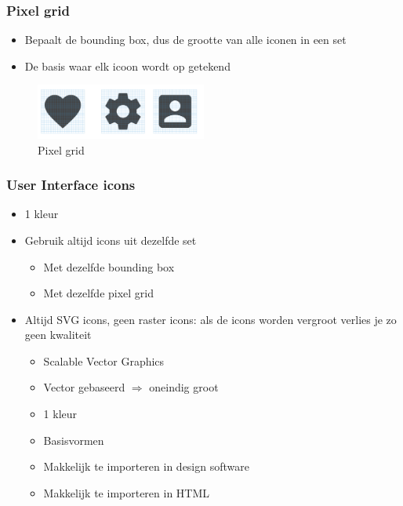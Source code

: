\documentclass{article}
\begin{document}
\subsubsection{Pixel grid}
\begin{itemize}
    \item Bepaalt de bounding box, dus de grootte van alle iconen in een set
    \item De basis waar elk icoon wordt op getekend
\end{itemize}


\begin{figure}[H]
    \centering
    \includegraphics[width=0.5\textwidth]{img/Screenshot_20200512_170736.png}
    \caption{Pixel grid}
\end{figure}

\subsubsection{User Interface icons}
\begin{itemize}
    \item 1 kleur
    \item Gebruik altijd icons uit dezelfde set
    \begin{itemize}
        \item Met dezelfde bounding box
        \item Met dezelfde pixel grid
    \end{itemize} 
    \item Altijd SVG icons, geen raster icons: als de icons worden vergroot verlies je zo geen kwaliteit
    \begin{itemize}
        \item Scalable Vector Graphics
        \item Vector gebaseerd $\Rightarrow$ oneindig groot
        \item 1 kleur
        \item Basisvormen
        \item Makkelijk te importeren in design software
        \item Makkelijk te importeren in HTML
    \end{itemize}
\end{itemize}
\end{document}
